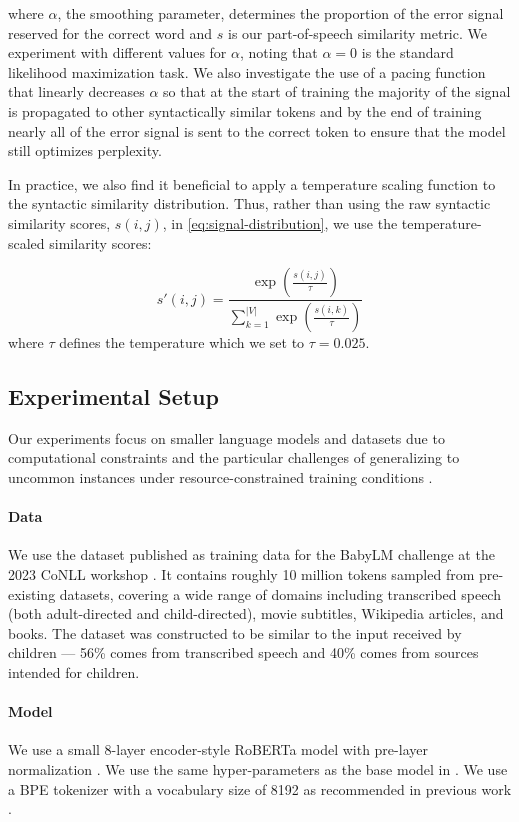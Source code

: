\noindent
where $\alpha$, the smoothing parameter, determines the proportion of the error signal reserved for the correct word and $s$ is our part-of-speech similarity metric. We experiment with different values for $\alpha$, noting that $\alpha=0$ is the standard likelihood maximization task. We also investigate the use of a pacing function that linearly decreases $\alpha$ so that at the start of training the majority of the signal is propagated to other syntactically similar tokens and by the end of training nearly all of the error signal is sent to the correct token to ensure that the model still optimizes perplexity. 

In practice, we also find it beneficial to apply a temperature scaling function to the syntactic similarity distribution. Thus, rather than using the raw syntactic similarity scores, $s(i,j)$, in \cref{eq:signal-distribution}, we use the temperature-scaled similarity scores:

$$
s'(i,j) = \frac{\exp\left(\frac{s(i,j)}{\tau}\right)}{\sum_{k=1}^{|V|} \exp\left(\frac{s(i,k)}{\tau}\right)}
$$
where $\tau$ defines the temperature which we set to $\tau=0.025$.

\subsection{Experimental Setup}
\label{subsection:experimental_setup}

Our experiments focus on smaller language models and datasets due to computational constraints and the particular challenges of generalizing to uncommon instances under resource-constrained training conditions \citep{warstadt2023babylm1,diehlmartinez2023climb}. 

\paragraph{Data} \label{paragraph:data} We use the dataset published as training data for the BabyLM challenge at the 2023 CoNLL workshop \citep{warstadt2023babylm1}. It contains roughly 10 million tokens sampled from pre-existing datasets, covering a wide range of domains including transcribed speech (both adult-directed and child-directed), movie subtitles, Wikipedia articles, and books. The dataset was constructed to be similar to the input received by children --- 56\% comes from transcribed speech and 40\% comes from sources intended for children.

\paragraph{Model} We use a small 8-layer encoder-style RoBERTa model with pre-layer normalization \cite{huebner2021babyberta}. We use the same hyper-parameters as the base model in \cite{diehlmartinez2023climb}. We use a BPE tokenizer \citep{sennrich2016bpe} with a vocabulary size of 8192 as recommended in previous work \cite{diehlmartinez2023climb}. 

